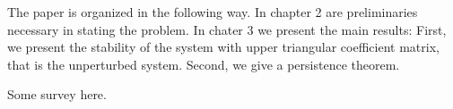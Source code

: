 \documentclass[a4paper,11pt]{article}
\newcounter{Theorem}
\theoremstyle{remark}
\begin{document}





The paper is organized in the following way. In chapter 2 are preliminaries necessary in stating the problem. In chater 3 we present the main results: First, we present the stability of the system with upper triangular coefficient matrix,  that is the unperturbed system. Second, we give a persistence theorem.



Some survey here.
\end{document}
